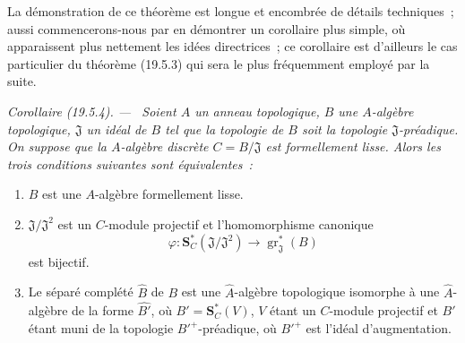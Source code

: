 \documentclass[10pt,oneside]{book}
\makeatletter
\newcommand{\gr}{\operatorname{gr}}
\newcommand{\setmanualcurrentlabel}[1]{\def\@currentlabel{#1}}
\newenvironment{corollary}[1][]{%
  \setmanualcurrentlabel{#1}\par\medskip\noindent\itshape Corollaire (#1). ---\ }{\par}
\makeatother
\begin{document}
La démonstration de ce théorème est longue et encombrée de détails techniques~;
aussi commencerons-nous par en démontrer un corollaire plus simple, où
apparaissent plus nettement les idées directrices~; ce corollaire est d'ailleurs
le cas particulier du théorème (19.5.3) qui sera le plus fréquemment employé
par la suite.

\begin{corollary}[19.5.4]
\label{0.19.5.4-fr}
Soient $A$ un anneau topologique, $B$ une $A$-algèbre topologique,
$\mathfrak J$ un idéal de $B$ tel que la topologie de $B$ soit la topologie
$\mathfrak J$-préadique. On suppose que la $A$-algèbre discrète
$C=B/\mathfrak J$ est formellement lisse. Alors les trois conditions suivantes
sont équivalentes~:
\begin{enumerate}
  \item[a)] $B$ est une $A$-algèbre formellement lisse.
  \item[b)] $\mathfrak J/\mathfrak J^2$ est un $C$-module projectif et
  l'homomorphisme canonique
  \[
    \varphi:\mathbf S_C^*(\mathfrak J/\mathfrak J^2)
    \longrightarrow\gr_{\mathfrak J}^*(B)
  \]
  est bijectif.
  \item[c)] Le séparé complété $\widehat B$ de $B$ est une
  $\widehat A$-algèbre topologique isomorphe à une $\widehat A$-algèbre de la
  forme $\widehat{B'}$, où $B'=\mathbf S_C^*(V)$, $V$ étant un $C$-module
  projectif et $B'$ étant muni de la topologie ${B'}^+$-préadique, où
  ${B'}^+$ est l'idéal d'augmentation.
\end{enumerate}
\end{corollary}
\end{document}
